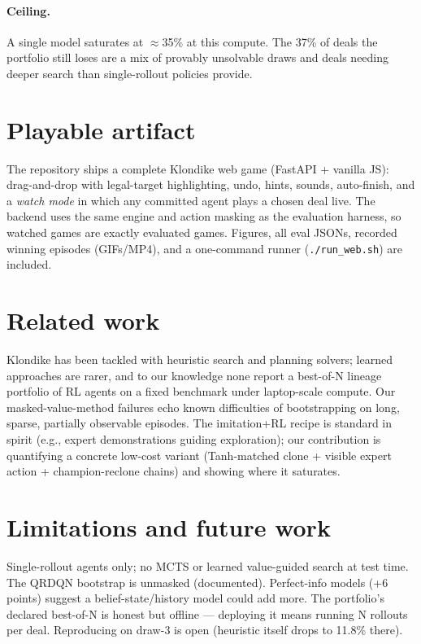 \documentclass[11pt]{article}
\begin{document}
\paragraph{Ceiling.} A single model saturates at $\approx$35\% at this
compute. The 37\% of deals the portfolio still loses are a mix of provably
unsolvable draws and deals needing deeper search than single-rollout
policies provide.

\section{Playable artifact}\label{sec:web}
The repository ships a complete Klondike web game (FastAPI + vanilla JS):
drag-and-drop with legal-target highlighting, undo, hints, sounds,
auto-finish, and a \emph{watch mode} in which any committed agent plays a
chosen deal live. The backend uses the same engine and action masking as
the evaluation harness, so watched games are exactly evaluated games.
Figures, all eval JSONs, recorded winning episodes (GIFs/MP4), and a
one-command runner (\texttt{./run\_web.sh}) are included.

\section{Related work}
Klondike has been tackled with heuristic search and planning solvers;
learned approaches are rarer, and to our knowledge none report a
best-of-N lineage portfolio of RL agents on a fixed benchmark under
laptop-scale compute. Our masked-value-method failures echo known
difficulties of bootstrapping on long, sparse, partially observable
episodes. The imitation+RL recipe is standard in spirit (e.g., expert
demonstrations guiding exploration); our contribution is quantifying a
concrete low-cost variant (Tanh-matched clone + visible expert action +
champion-reclone chains) and showing where it saturates.

\section{Limitations and future work}
Single-rollout agents only; no MCTS or learned value-guided search at
test time. The QRDQN bootstrap is unmasked (documented). Perfect-info
models (+6 points) suggest a belief-state/history model could add more.
The portfolio's declared best-of-N is honest but offline — deploying it
means running N rollouts per deal. Reproducing on draw-3 is open
(heuristic itself drops to 11.8\% there).
\end{document}
